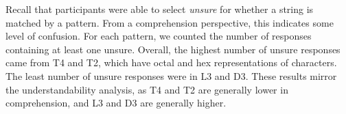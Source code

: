 Recall that participants were able to select \emph{unsure} for whether a string is matched by a pattern.
From a comprehension perspective, this indicates some level of confusion.
For each pattern, we counted the number of responses containing at least one unsure.
Overall, the highest number of unsure responses came from T4 and T2, which have octal and hex representations of characters. The least number of unsure responses were in L3 and D3.
These results mirror the understandability analysis, as T4 and T2 are generally lower in comprehension, and L3 and D3 are generally higher.%

